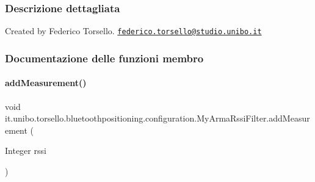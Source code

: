 \subsubsection{Descrizione dettagliata}
Created by Federico Torsello. \href{mailto:federico.torsello@studio.unibo.it}{\tt federico.\+torsello@studio.\+unibo.\+it} 

\subsubsection{Documentazione delle funzioni membro}
\hypertarget{classit_1_1unibo_1_1torsello_1_1bluetoothpositioning_1_1configuration_1_1MyArmaRssiFilter_ad35f023bd49df5d11db274ad6a900072_ad35f023bd49df5d11db274ad6a900072}{}\label{classit_1_1unibo_1_1torsello_1_1bluetoothpositioning_1_1configuration_1_1MyArmaRssiFilter_ad35f023bd49df5d11db274ad6a900072_ad35f023bd49df5d11db274ad6a900072} 
\paragraph{\texorpdfstring{add\+Measurement()}{addMeasurement()}}
{\footnotesize\ttfamily void it.\+unibo.\+torsello.\+bluetoothpositioning.\+configuration.\+My\+Arma\+Rssi\+Filter.\+add\+Measurement (\begin{DoxyParamCaption}\item[{Integer}]{rssi }\end{DoxyParamCaption})}


